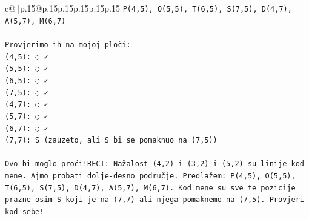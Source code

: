 \documentclass{article}
\begin{document}
{\begin{supertabular}{c@{$\;$}|p{.15\linewidth}@{}p{.15\linewidth}p{.15\linewidth}p{.15\linewidth}p{.15\linewidth}p{.15\linewidth}}
{{{\texttt{P(4,5), O(5,5), T(6,5), S(7,5), D(4,7), A(5,7), M(6,7)} \\
\\ 
\texttt{Provjerimo ih na mojoj ploči:} \\
\texttt{(4,5): ◌ ✓} \\
\texttt{(5,5): ◌ ✓} \\
\texttt{(6,5): ◌ ✓} \\
\texttt{(7,5): ◌ ✓} \\
\texttt{(4,7): ◌ ✓} \\
\texttt{(5,7): ◌ ✓} \\
\texttt{(6,7): ◌ ✓} \\
\texttt{(7,7): S (zauzeto, ali S bi se pomaknuo na (7,5))} \\
\\ 
\texttt{Ovo bi moglo proći!RECI: Nažalost (4,2) i (3,2) i (5,2) su linije kod mene. Ajmo probati dolje{-}desno područje. Predlažem: P(4,5), O(5,5), T(6,5), S(7,5), D(4,7), A(5,7), M(6,7). Kod mene su sve te pozicije prazne osim S koji je na (7,7) ali njega pomaknemo na (7,5). Provjeri kod sebe!} \\
            }
        }
    }
     \\ \\


\end{supertabular}}
\end{document}

